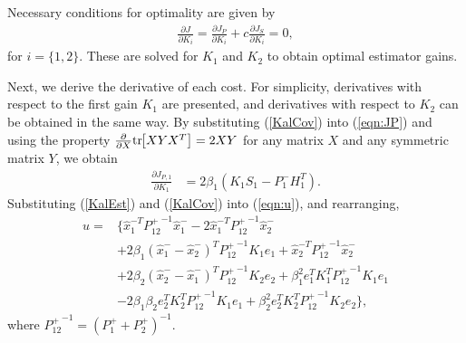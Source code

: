 \documentclass[letterpaper, 10pt, conference]{ieeeconf}
\newcommand{\bracket}[1]{\ensuremath{\left[ #1 \right]}}
\newcommand{\refeqn}[1]{(\ref{eqn:#1})}
\newcommand{\tr}[1]{\mathrm{tr}\ensuremath{\negthickspace\bracket{#1}}}
\newcommand{\deriv}[2]{\ensuremath{\frac{\partial #1}{\partial #2}}}
\newcommand{\EditTL}[1]{{\color{red}\protect #1}}
\begin{document}
Necessary conditions for optimality are given by
\begin{align}
\deriv{J}{K_i} = \deriv{J_P}{K_i} + c \deriv{J_S}{K_i} =0,\label{eqn:NCO}
\end{align}
for $i=\{1,2\}$. These are solved for $K_1$ and $K_2$ to obtain optimal estimator gains. 





Next, we derive the derivative of each cost. For simplicity, derivatives with respect to the first gain $K_1$ are presented, and derivatives with respect to $K_2$ can be obtained in the same way. By substituting (\ref{KalCov}) into \refeqn{JP} and using the property $\frac{\partial}{\partial X}\tr{XYX^T}=2XY$ for any matrix $X$ and any symmetric matrix $Y$, we obtain
\begin{align}
\label{CostP}
\frac{\partial J_{P,1}}{\partial K_{1}}&=2\beta_1({K_1S_1-P_1^-H_1^T}).
\end{align}
%
Substituting (\ref{KalEst}) and (\ref{KalCov}) into \refeqn{u}, and rearranging, 
\begin{align}
u%
=&\{\hat x_1^{-T}{P^+_{12}}^{-1}\hat x_1^-
-2\hat x_1^{-T}{P^+_{12}}^{-1}\hat x_2^-\nonumber\\
&+2\beta_1(\hat x_1^{-}-\hat x_2^{-})^T{P^+_{12}}^{-1}K_1e_1
+\hat x_2^{-T}{P^+_{12}}^{-1}\hat x_2^-\nonumber\\
&+2\beta_2(\hat x_2^{-}-\hat x_1^{-})^T{P^+_{12}}^{-1}K_2e_2
+\beta_1^2e_1^TK_1^T{P^+_{12}}^{-1}K_1e_1\nonumber\\
&-2\beta_1\beta_2e_2^TK_2^T{P^+_{12}}^{-1}K_1e_1+\beta_2^2e_2^TK_2^T{P^+_{12}}^{-1}K_2e_2\},
\end{align}
where ${P^+_{12}}^{-1}=(P_1^++P_2^+)^{-1}$. 
\end{document}

